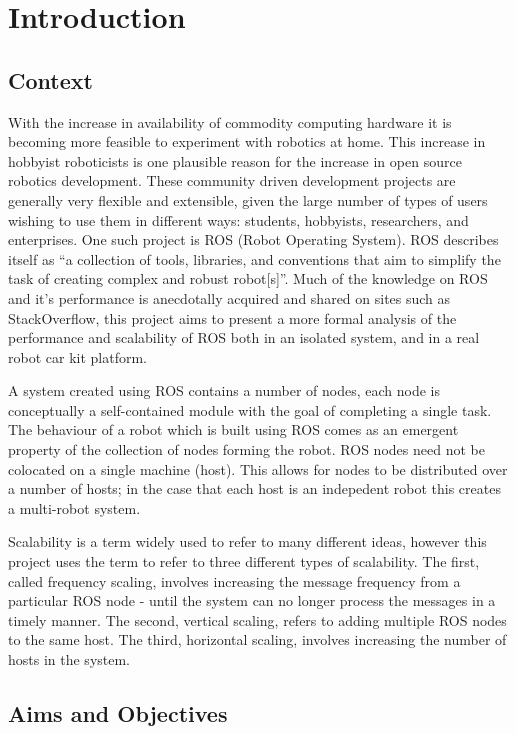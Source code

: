 \documentclass[../dissertation.tex]{subfiles}
\begin{document}
\chapter{Introduction}
\label{introduction-chapter}

\section{Context}

With the increase in availability of commodity computing hardware it is becoming more feasible to experiment with robotics at home. This increase in hobbyist roboticists is one plausible reason for the increase in open source robotics development. These community driven development projects are generally very flexible and extensible, given the large number of types of users wishing to use them in different ways: students, hobbyists, researchers, and enterprises. One such project is ROS (Robot Operating System). ROS describes itself as ``a collection of tools, libraries, and conventions that aim to simplify the task of creating complex and robust robot[s]''\cite{rosaboutpage}. Much of the knowledge on ROS and it's performance is anecdotally acquired and shared on sites such as StackOverflow, this project aims to present a more formal analysis of the performance and scalability of ROS both in an isolated system, and in a real robot car kit platform.

A system created using ROS contains a number of nodes, each node is conceptually a self-contained module with the goal of completing a single task. The behaviour of a robot which is built using ROS comes as an emergent property of the collection of nodes forming the robot. ROS nodes need not be colocated on a single machine (host). This allows for nodes to be distributed over a number of hosts; in the case that each host is an indepedent robot this creates a multi-robot system.

Scalability is a term widely used to refer to many different ideas, however this project uses the term to refer to three different types of scalability. The first, called frequency scaling, involves increasing the message frequency from a particular ROS node - until the system can no longer process the messages in a timely manner. The second, vertical scaling, refers to adding multiple ROS nodes to the same host. The third, horizontal scaling, involves increasing the number of hosts in the system.

\section{Aims and Objectives}
\end{document}

